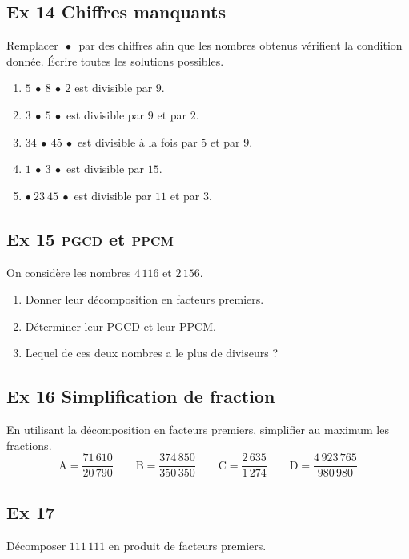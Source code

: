 \documentclass[a4paper,11pt]{article}
\begin{document}
\bigskip

\subsection*{Ex 14 \; Chiffres manquants}
Remplacer \(\,\bullet\,\) par des chiffres afin que les nombres obtenus vérifient la condition donnée. Écrire toutes les solutions possibles.
\begin{enumerate}
  \item \(5\ \bullet\ 8\ \bullet\ 2\) est divisible par \(9\).
  \item \(3\ \bullet\ 5\ \bullet\) est divisible par \(9\) et par \(2\).
  \item \(34\ \bullet\ 45\ \bullet\) est divisible à la fois par \(5\) et par \(9\).
  \item \(1\ \bullet\ 3\ \bullet\) est divisible par \(15\).
  \item \(\bullet\ 23\ 45\ \bullet\) est divisible par \(11\) et par \(3\).
\end{enumerate}

\bigskip

\subsection*{Ex 15 \; \textsc{pgcd} et \textsc{ppcm}}
On considère les nombres \(4\,116\) et \(2\,156\).
\begin{enumerate}
  \item Donner leur décomposition en facteurs premiers.
  \item Déterminer leur \(\mathrm{PGCD}\) et leur \(\mathrm{PPCM}\).
  \item Lequel de ces deux nombres a le plus de diviseurs ?
\end{enumerate}

\bigskip

\subsection*{Ex 16 \; Simplification de fraction}
En utilisant la décomposition en facteurs premiers, simplifier au maximum les fractions.
\[
\mathrm{A}=\dfrac{71\,610}{20\,790}
\qquad
\mathrm{B}=\dfrac{374\,850}{350\,350}
\qquad
\mathrm{C}=\dfrac{2\,635}{1\,274}
\qquad
\mathrm{D}=\dfrac{4\,923\,765}{980\,980}
\]

\bigskip

\subsection*{Ex 17}
Décomposer \(111\,111\) en produit de facteurs premiers.
\end{document}
